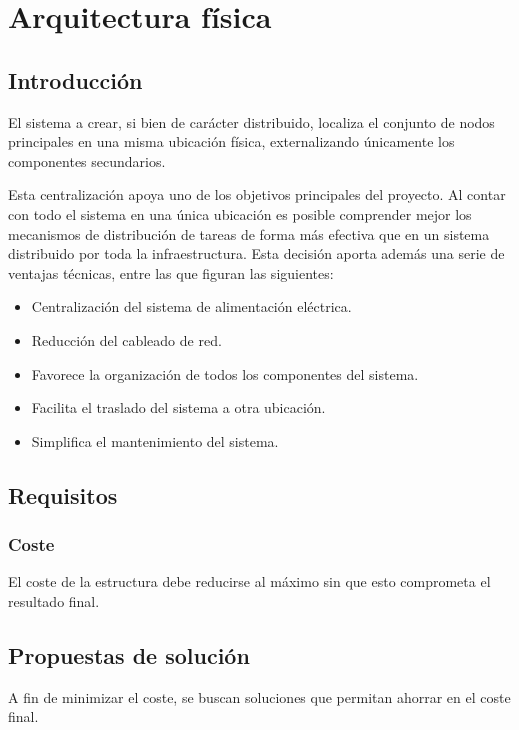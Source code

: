 \chapter{Arquitectura física}

\section{Introducción}

El sistema a crear, si bien de carácter distribuido, localiza el conjunto de nodos principales en una misma ubicación física, externalizando únicamente los componentes secundarios.

Esta centralización apoya uno de los objetivos principales del proyecto. Al contar con todo el sistema en una única ubicación es posible comprender mejor los mecanismos de distribución de tareas de forma más efectiva que en un sistema distribuido por toda la infraestructura. Esta decisión aporta además una serie de ventajas técnicas, entre las que figuran las siguientes:

\begin{itemize}
\item Centralización del sistema de alimentación eléctrica.
\item Reducción del cableado de red.
\item Favorece la organización de todos los componentes del sistema.
\item Facilita el traslado del sistema a otra ubicación.
\item Simplifica el mantenimiento del sistema.
\end{itemize}

\section{Requisitos}

\subsection{Coste}

El coste de la estructura debe reducirse al máximo sin que esto comprometa el resultado final.

\section{Propuestas de solución}

A fin de minimizar el coste, se buscan soluciones que permitan ahorrar en el coste final.

